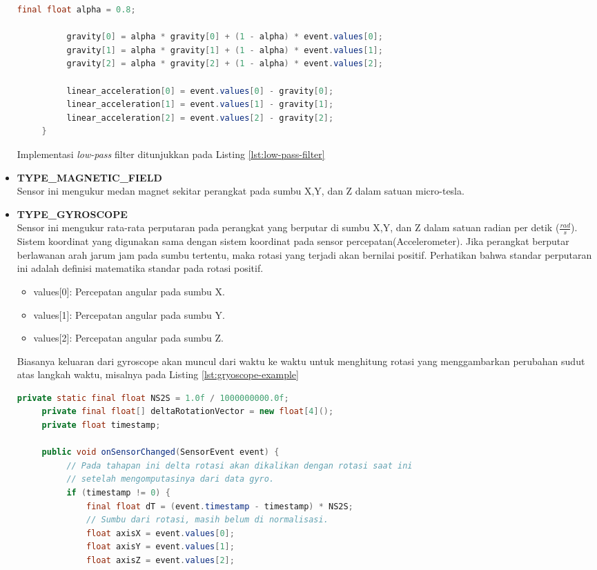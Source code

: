 \begin{itemize}
\begin{lstlisting}[caption={Implementasi \textit{low-pass} filter},label={lst:low-pass-filter},language=java]
          final float alpha = 0.8;

          gravity[0] = alpha * gravity[0] + (1 - alpha) * event.values[0];
          gravity[1] = alpha * gravity[1] + (1 - alpha) * event.values[1];
          gravity[2] = alpha * gravity[2] + (1 - alpha) * event.values[2];

          linear_acceleration[0] = event.values[0] - gravity[0];
          linear_acceleration[1] = event.values[1] - gravity[1];
          linear_acceleration[2] = event.values[2] - gravity[2];
     }
\end{lstlisting}
Implementasi \textit{low-pass} filter ditunjukkan pada Listing \ref{lst:low-pass-filter}\\
\item \textbf{TYPE\_MAGNETIC\_FIELD}\\
Sensor ini mengukur medan magnet sekitar perangkat pada sumbu X,Y, dan Z dalam satuan micro-tesla.\\
\item \textbf{TYPE\_GYROSCOPE}\\
Sensor ini mengukur rata-rata perputaran pada perangkat yang berputar di sumbu X,Y, dan Z dalam satuan radian per detik ($\frac{rad}{s}$). Sistem koordinat yang digunakan sama dengan sistem koordinat pada sensor percepatan(Accelerometer). Jika perangkat berputar berlawanan arah jarum jam pada sumbu tertentu, maka rotasi yang terjadi akan bernilai positif. Perhatikan bahwa standar perputaran ini adalah definisi matematika standar pada rotasi positif.
\begin{itemize}
	\item values[0]: Percepatan angular pada sumbu X.
	\item values[1]: Percepatan angular pada sumbu Y.
	\item values[2]: Percepatan angular pada sumbu Z.
\end{itemize}
Biasanya keluaran dari gyroscope akan muncul dari waktu ke waktu untuk menghitung rotasi yang menggambarkan perubahan sudut atas langkah waktu, misalnya pada Listing \ref{lst:gryoscope-example}
\begin{lstlisting}[caption=contoh implementasi gyroscope,label={lst:gryoscope-example},language=java]
	  private static final float NS2S = 1.0f / 1000000000.0f;
     private final float[] deltaRotationVector = new float[4]();
     private float timestamp;

     public void onSensorChanged(SensorEvent event) {
          // Pada tahapan ini delta rotasi akan dikalikan dengan rotasi saat ini
          // setelah mengomputasinya dari data gyro.
          if (timestamp != 0) {
              final float dT = (event.timestamp - timestamp) * NS2S;
              // Sumbu dari rotasi, masih belum di normalisasi.
              float axisX = event.values[0];
              float axisY = event.values[1];
              float axisZ = event.values[2];


\end{lstlisting}
\end{itemize}
